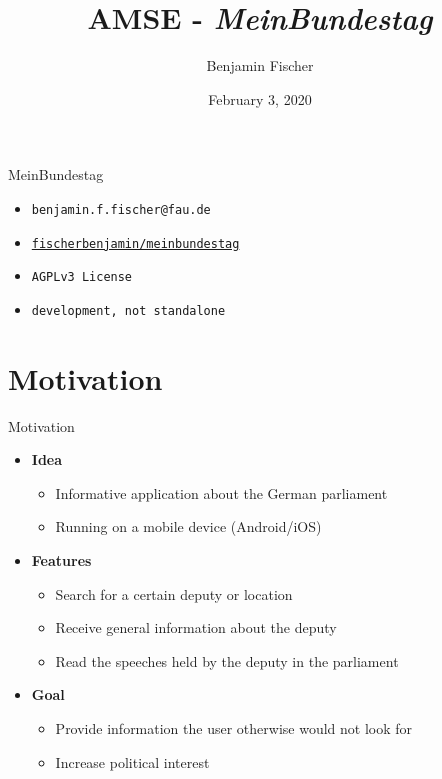 \documentclass{beamer}
\title{AMSE - \textit{MeinBundestag}}
\date{February 3, 2020}
\author{Benjamin Fischer}
\institute{\faInstitution{}\quad{}Friedrich-Alexander Universität Erlangen-Nürnberg}
\begin{document}
  \maketitle

  \begin{frame}[plain]{MeinBundestag}
    \begin{itemize}
      \item[\faEnvelope]\quad
      \texttt{benjamin.f.fischer@fau.de}
      \item[\faGithub]\quad
      \href{https://github.com/fischerbenjamin/meinbundestag}{\texttt{fischerbenjamin/meinbundestag}}
      \item[\faCopyright]\quad
      \texttt{AGPLv3 License}
      \item[\faCogs]\quad
      \texttt{development, not standalone}
    \end{itemize} 
  \end{frame}

  \section{Motivation}
  \begin{frame}[plain]{Motivation}
    \begin{itemize}
      \item[\faInfoCircle]\quad
      \textbf{Idea}
      \begin{itemize}
        \item Informative application about the German parliament
        \item Running on a mobile device (Android/iOS)
      \end{itemize}
      \item[\faBars]\quad
      \textbf{Features}
      \begin{itemize}
        \item Search for a certain deputy or location
        \item Receive general information about the deputy
        \item Read the speeches held by the deputy in the parliament
      \end{itemize}
      \item[\faHeart]\quad
      \textbf{Goal}
      \begin{itemize}
        \item Provide information the user otherwise would not look for
        \item Increase political interest
      \end{itemize}
    \end{itemize}
  \end{frame}
\end{document}
